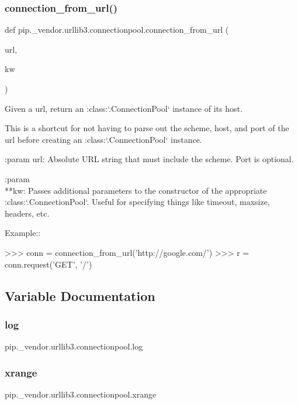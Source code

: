 \subsubsection{\texorpdfstring{connection\+\_\+from\+\_\+url()}{connection\_from\_url()}}
{\footnotesize\ttfamily def pip.\+\_\+vendor.\+urllib3.\+connectionpool.\+connection\+\_\+from\+\_\+url (\begin{DoxyParamCaption}\item[{}]{url,  }\item[{}]{kw }\end{DoxyParamCaption})}

\begin{DoxyVerb}Given a url, return an :class:`.ConnectionPool` instance of its host.

This is a shortcut for not having to parse out the scheme, host, and port
of the url before creating an :class:`.ConnectionPool` instance.

:param url:
    Absolute URL string that must include the scheme. Port is optional.

:param \\**kw:
    Passes additional parameters to the constructor of the appropriate
    :class:`.ConnectionPool`. Useful for specifying things like
    timeout, maxsize, headers, etc.

Example::

    >>> conn = connection_from_url('http://google.com/')
    >>> r = conn.request('GET', '/')
\end{DoxyVerb}
 

\subsection{Variable Documentation}
\mbox{\label{namespacepip_1_1__vendor_1_1urllib3_1_1connectionpool_a1bff2928ed0d70d7b462c2014699e21a}} 
\subsubsection{\texorpdfstring{log}{log}}
{\footnotesize\ttfamily pip.\+\_\+vendor.\+urllib3.\+connectionpool.\+log}

\mbox{\label{namespacepip_1_1__vendor_1_1urllib3_1_1connectionpool_af4fe29676fd273dfca039e3b53b7c92d}} 
\subsubsection{\texorpdfstring{xrange}{xrange}}
{\footnotesize\ttfamily pip.\+\_\+vendor.\+urllib3.\+connectionpool.\+xrange}

